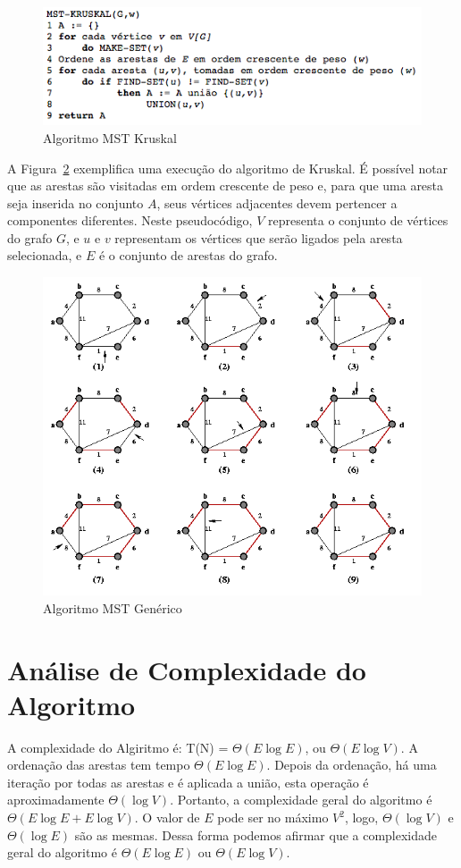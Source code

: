 \documentclass[12pt]{article}
\begin{document}
\begin{figure}[ht]
    \centering
    \includegraphics[width=1\textwidth]{imagens/mst_kruskal.png}
    \caption{Algoritmo MST Kruskal}
    \label{fig:mst_kruskal}
\end{figure}

A Figura~\ref{fig:exec_kruskal} exemplifica uma execução do algoritmo de Kruskal. É possível notar que as arestas são visitadas em ordem crescente de peso e, para que uma aresta seja inserida no conjunto $A$, seus vértices adjacentes devem pertencer a componentes diferentes. Neste pseudocódigo, $V$ representa o conjunto de vértices do grafo $G$, e $u$ e $v$ representam os vértices que serão ligados pela aresta selecionada, e $E$ é o conjunto de arestas do grafo.

\begin{figure}[ht]
    \centering
    \includegraphics[width=1\textwidth]{imagens/execucao_kruskal.png}
    \caption{Algoritmo MST Genérico}
    \label{fig:exec_kruskal}
\end{figure}


\section{Análise de Complexidade do Algoritmo}
		A complexidade do Algiritmo é: T(N) = $\Theta (E\log E)$, ou $\Theta (E\log V)$. A ordenação das arestas tem tempo $\Theta (E\log E)$. Depois da ordenação, há uma iteração por todas as arestas e é aplicada a união, esta operação é aproximadamente $\Theta (\log V)$. Portanto, a complexidade geral do algoritmo é  $\Theta(E\log E + E\log V)$. O valor de $E$ pode ser no máximo $V^2$, logo, $\Theta(\log V)$ e $\Theta(\log E)$ são as mesmas. Dessa forma podemos afirmar que a complexidade geral do algoritmo é $\Theta (E\log E)$ ou $\Theta (E\log V)$. \cite{geeks:2012}
\end{document}
